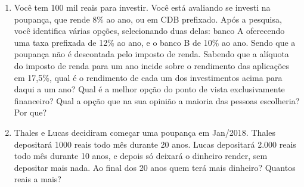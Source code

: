 \begin{enumerate}
\item Você tem 100 mil reais para investir. Você está avaliando se investi na poupança, que rende 8\% ao ano, ou em CDB prefixado. Após a pesquisa, você identifica várias opções, selecionando duas delas: banco A oferecendo uma taxa prefixada de 12\% ao ano, e o banco B de 10\% ao ano. Sendo que a poupança não é descontada pelo imposto de renda. Sabendo que a alíquota do imposto de renda para um ano incide sobre o rendimento das aplicações em 17,5\%, qual é o rendimento de cada um dos investimentos acima para daqui a um ano? Qual é a melhor opção do ponto de vista exclusivamente financeiro? Qual a opção que na sua opinião a maioria das pessoas escolheria? Por que?

\item Thales e Lucas decidiram começar uma poupança em Jan/2018. Thales depositará 1000 reais todo mês durante 20 anos. Lucas depositará 2.000 reais todo mês durante 10 anos, e depois só deixará o dinheiro render, sem depositar mais nada. Ao final dos 20 anos quem terá mais dinheiro? Quantos reais a mais?
\end{enumerate}
\clearpage

